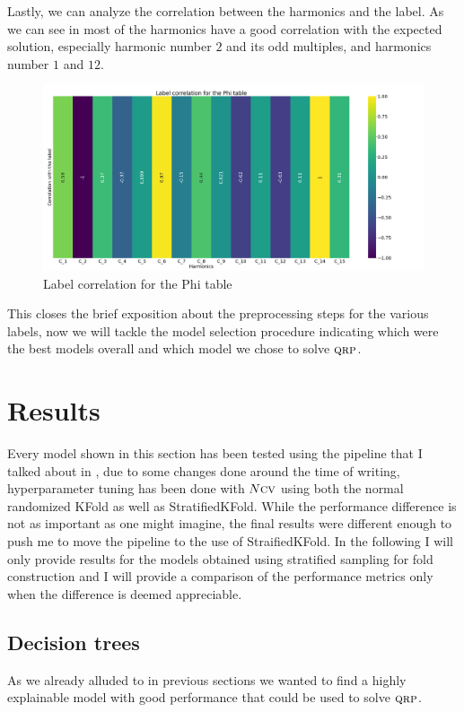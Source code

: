 Lastly, we can analyze the correlation between the harmonics and the label. As we can see in  most of the harmonics have a good correlation with the expected solution, especially harmonic number $2$ and its odd multiples, and harmonics number $1$ and $12$.
\begin{figure}[h!]
	\centering
	\includegraphics[scale=.2]{img/Phi_label_corr.png}
	\caption{Label correlation for the Phi table} \label{fig:phi-lcorr}
\end{figure}
This closes the brief exposition about the preprocessing steps for the various labels, now we will
tackle the model selection procedure indicating which were the best models overall and which model
we chose to solve $\textsc{qrp}$.

\section{Results}
Every model shown in this section has been tested using the pipeline that I talked about in
, due to some changes done around the time of writing, hyperparameter tuning has
been done with $N\textsc{cv}$ using both the normal randomized KFold as well as StratifiedKFold. While the
performance difference is not as important as one might imagine, the final results were different
enough to push me to move the pipeline to the use of StraifiedKFold. In the following I will only
provide results for the models obtained using stratified sampling for fold construction and I will
provide a comparison of the performance metrics only when the difference is deemed appreciable.

\subsection{Decision trees}
As we already alluded to in previous sections we wanted to find a highly explainable model with good
performance that could be used to solve $\textsc{qrp}$.

